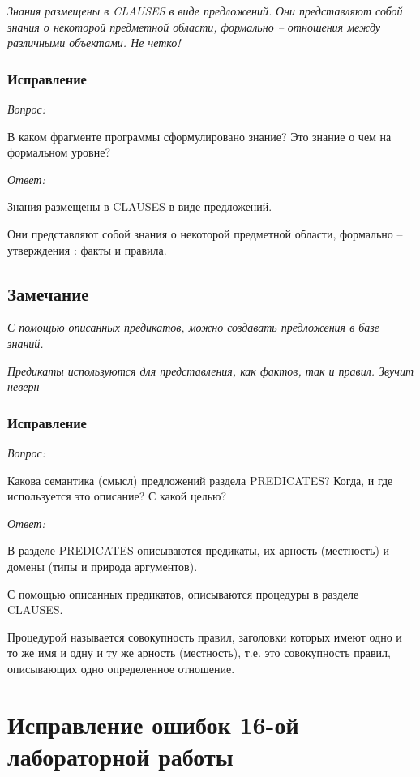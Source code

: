\documentclass[a4paper,12pt]{article}
\begin{document}
	\textit{Знания размещены в CLAUSES в виде предложений.}
	\textit{Они представляют собой знания о некоторой предметной области,} \textit{формально – отношения между различными объектами. Не четко!}
	
	\subsubsection*{Исправление}
	
	\textit{Вопрос:} 
	
	В каком фрагменте программы сформулировано знание? Это знание о чем на формальном уровне?

	\textit{Ответ:}
	
	Знания размещены в CLAUSES в виде предложений.
	
	Они представляют собой знания о некоторой предметной области, формально – утверждения : факты и правила.
	
	\subsection*{Замечание}
	
	\textit{С помощью описанных предикатов, можно создавать предложения в базе знаний.}
	
	\textit{Предикаты используются для представления, как фактов, так и правил. Звучит неверн}
	
	\subsubsection*{Исправление}
	
	\textit{Вопрос:}
	
	Какова семантика (смысл) предложений раздела PREDICATES? Когда, и где используется это описание? С какой целью?
	
	\textit{Ответ:}
	
	В разделе PREDICATES описываются предикаты, их арность (местность) и домены (типы и природа аргументов).
	
	С помощью описанных предикатов, описываются процедуры в разделе CLAUSES.
	
	Процедурой называется совокупность правил, заголовки которых имеют одно и то же имя и одну и ту же арность (местность), т.е. это совокупность правил, описывающих одно определенное отношение. 

	\section*{Исправление ошибок 16-ой лабораторной работы}
	
\end{document}

